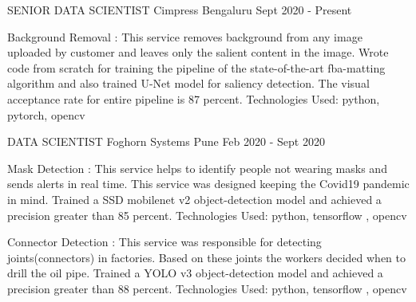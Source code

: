 
\begin{cventries}

    \cventry
    {SENIOR DATA SCIENTIST} %
    {Cimpress} %
    {Bengaluru} %
    {Sept 2020 - Present} %
    {
      \begin{cvitems} %
      \item{Background Removal : This service removes background from any image uploaded by customer and leaves only the salient content in the
image. Wrote code from scratch for training the pipeline of the state-of-the-art fba-matting algorithm and also trained U-Net model for saliency
detection. The visual acceptance rate for entire pipeline is 87 percent. Technologies Used: python, pytorch, opencv }
	\end{cvitems}
    }
\vspace{2em} %
  \cventry
    {DATA SCIENTIST} %
    {Foghorn Systems} %
    {Pune} %
    {Feb 2020 - Sept 2020} %
    {
      \begin{cvitems} %
      \item{Mask Detection : This service helps to identify people not wearing masks and sends alerts in real time. This service was designed keeping the Covid19 pandemic in mind. Trained a SSD mobilenet v2 object-detection model and achieved a precision greater than 85 percent. Technologies Used: python, tensorflow , opencv  }
      \item{Connector Detection : This service was responsible for detecting joints(connectors) in factories. Based on these joints the workers decided when to drill the oil pipe.  Trained a YOLO v3 object-detection model and achieved a precision greater than 88 percent. Technologies Used: python, tensorflow , opencv }
	\end{cvitems}
    }

\end{cventries}
